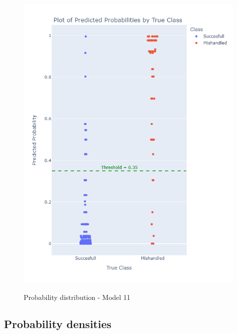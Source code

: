 \documentclass[12pt]{article}
\begin{document}
\begin{figure}
\begin{minipage}[c]{0.4\linewidth}
    \includegraphics[width=1\textwidth]{Probability_distribution_Model 11.png}\\
    \caption{Probability distribution - Model 11}
\end{minipage}
\hfill
\begin{minipage}[c]{0.4\linewidth}
\end{minipage}%
\end{figure}
\FloatBarrier



\newpage
\subsection*{Probability densities}


\newpage
\end{document}

